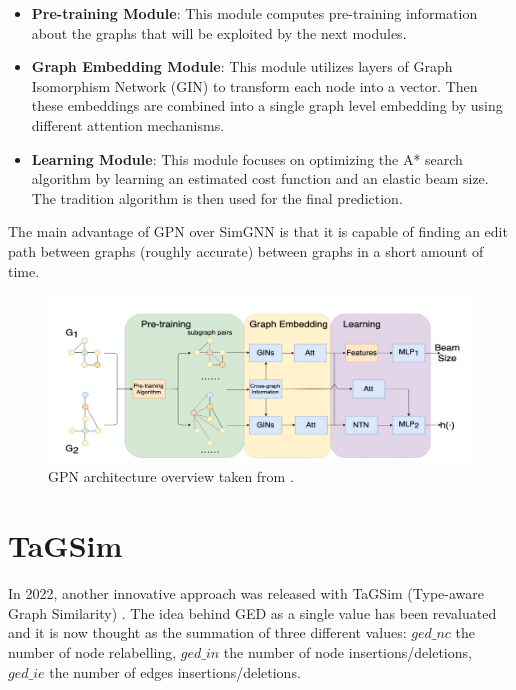 \documentclass[../Thesis.tex]{subfiles}
\begin{document}
	\begin{itemize}
		\item \textbf{Pre-training Module}: This module computes pre-training information about the graphs that will be exploited by the next modules.
		\item \textbf{Graph Embedding Module}: This module utilizes layers of Graph Isomorphism Network (GIN) to transform each node into a vector. Then these embeddings are combined into a single graph level embedding by using different attention mechanisms.
		\item \textbf{Learning Module}: This module focuses on optimizing the A* search algorithm by learning an estimated cost function and an elastic beam size. The tradition algorithm is then used for the final prediction.
	\end{itemize}
	
	The main advantage of GPN over SimGNN is that it is capable of finding an edit path between graphs (roughly accurate) between graphs in a short amount of time.
	
	\begin{figure}[H]
		\centering
		\includegraphics[width=\textwidth]{Images/gpn_architecture.png}
		\caption{GPN architecture overview taken from \cite{noah__neural_optimized_a*_search_algorithm_for_graph_edit_distance_computation}.}
		\label{fig:gpn_architecture}
	\end{figure}
	
	
	\section{TaGSim}
	\label{sec:tagsim}
	
	In 2022, another innovative approach was released with TaGSim (Type-aware Graph Similarity) \cite{TaGSim_type_aware_graph_similarity_learning_and_computation}. The idea behind GED as a single value has been revaluated and it is now thought as the summation of three different values: $ged\_nc$ the number of node relabelling, $ged\_in$ the number of node insertions/deletions, $ged\_ie$ the number of edges insertions/deletions. 
	
\end{document}
